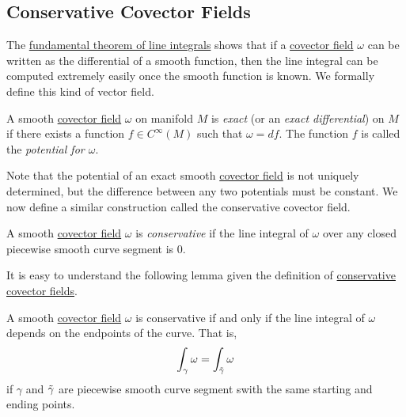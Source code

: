 \documentclass{article}
\newcounter{theorem}[section]
\newcounter{definition}[section]
\begin{document}
  \subsection{Conservative Covector Fields}

    The \hyperref[thm:fundamental-theorem-of-line-integrals]{fundamental theorem of line integrals} shows that if a \hyperref[def:covector-field]{covector field} $\omega$ can be written as the differential of a smooth function, then the line integral can be computed extremely easily once the smooth function is known. We formally define this kind of vector field. 

    \begin{definition}
      \label{def:exact-covector-field}
    A smooth \hyperref[def:covector-field]{covector field} $\omega$ on manifold $M$ is \textit{exact} (or an \textit{exact differential}) on $M$ if there exists a function $f \in C^\infty (M)$ such that $\omega = df$. The function $f$ is called the \textit{potential for $\omega$}. 
    \end{definition}

    Note that the potential of an exact smooth \hyperref[def:covector-field]{covector field} is not uniquely determined, but the difference between any two potentials must be constant. We now define a similar construction called the conservative covector field. 

    \begin{definition}
      \label{def:conservative-covector-field}
    A smooth \hyperref[def:covector-field]{covector field} $\omega$ is \textit{conservative} if the line integral of $\omega$ over any closed piecewise smooth curve segment is $0$. 
    \end{definition}

    It is easy to understand the following lemma given the definition of \hyperref[def:conservative-covector-field]{conservative covector fields}. 

    \begin{lemma}
      \label{thm:conservative-fields-have-path-independent}
    A smooth \hyperref[def:covector-field]{covector field} $\omega$ is conservative if and only if the line integral of $\omega$ depends on the endpoints of the curve. That is, 
    \begin{equation}
      \int_\gamma \omega = \int_{\Tilde{\gamma}} \omega
    \end{equation}
    if $\gamma$ and $\Tilde{\gamma}$ are piecewise smooth curve segment swith the same starting and ending points. 
    \end{lemma}
\end{document}
